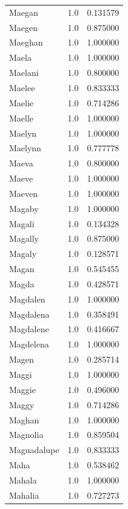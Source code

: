 \documentclass[
  letterpaper,
  DIV=11,
  numbers=noendperiod]{scrreprt}
\begin{document}
\begin{tabular}{lrr}
Maegan          &   1.0 &   0.131579 \\
Maegen          &   1.0 &   0.875000 \\
Maeghan         &   1.0 &   1.000000 \\
Maela           &   1.0 &   1.000000 \\
Maelani         &   1.0 &   0.800000 \\
Maelee          &   1.0 &   0.833333 \\
Maelie          &   1.0 &   0.714286 \\
Maelle          &   1.0 &   1.000000 \\
Maelyn          &   1.0 &   1.000000 \\
Maelynn         &   1.0 &   0.777778 \\
Maeva           &   1.0 &   0.800000 \\
Maeve           &   1.0 &   1.000000 \\
Maeven          &   1.0 &   1.000000 \\
Magaby          &   1.0 &   1.000000 \\
Magali          &   1.0 &   0.134328 \\
Magally         &   1.0 &   0.875000 \\
Magaly          &   1.0 &   0.128571 \\
Magan           &   1.0 &   0.545455 \\
Magda           &   1.0 &   0.428571 \\
Magdalen        &   1.0 &   1.000000 \\
Magdalena       &   1.0 &   0.358491 \\
Magdalene       &   1.0 &   0.416667 \\
Magdelena       &   1.0 &   1.000000 \\
Magen           &   1.0 &   0.285714 \\
Maggi           &   1.0 &   1.000000 \\
Maggie          &   1.0 &   0.496000 \\
Maggy           &   1.0 &   0.714286 \\
Maghan          &   1.0 &   1.000000 \\
Magnolia        &   1.0 &   0.859504 \\
Maguadalupe     &   1.0 &   0.833333 \\
Maha            &   1.0 &   0.538462 \\
Mahala          &   1.0 &   1.000000 \\
Mahalia         &   1.0 &   0.727273 \\

\end{tabular}
\end{document}
